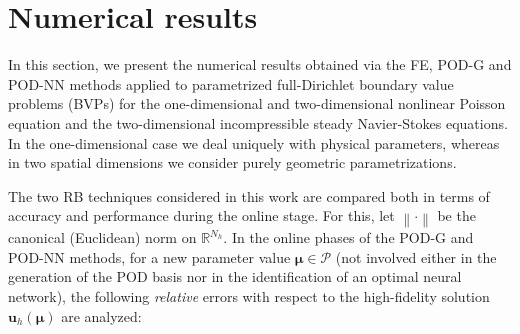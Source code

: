 \documentclass[longtitle]{elsarticle}
\numberwithin{equation}{section}
\theoremstyle{theorem}
\theoremstyle{definition}
\theoremstyle{remark}
\theoremstyle{proposition}
\numberwithin{figure}{section}
\newcommand{\norm}[1]{\left\lVert#1\right\rVert}
\newcommand{\bg}[1]{\boldsymbol{#1}}
\begin{document}
			
	
	\section{Numerical results}
	\label{section:Numerical results}
	
		In this section, we present the numerical results obtained via the FE, POD-G and POD-NN methods applied to parametrized full-Dirichlet boundary value problems (BVPs) for the one-dimensional and two-dimensional nonlinear Poisson equation and the two-dimensional incompressible steady Navier-Stokes equations. In the one-dimensional case we deal uniquely with physical parameters, whereas in two spatial dimensions we consider purely geometric parametrizations. 	

		The two RB techniques considered in this work are compared both in terms of accuracy and performance during the online stage. For this, let $\norm{\cdot}$ be the canonical (Euclidean) norm on $\mathbb{R}^{N_h}$. In the online phases of the POD-G and POD-NN methods, for a new parameter value $\bg{\mu} \in \mathcal{P}$ (not involved either in the generation of the POD basis nor in the identification of an optimal neural network), the following \emph{relative} errors with respect to the high-fidelity solution $\mathbf{u}_h(\bg{\mu})$ are analyzed:
\end{document}
